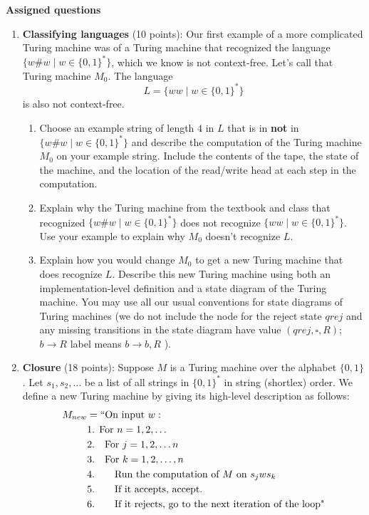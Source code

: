{\bf Assigned questions}
\begin{enumerate}[wide, labelwidth=!, labelindent=0pt]

\item\textbf{Classifying languages} (10 points):
Our first example of a more complicated Turing machine was of a Turing machine 
that recognized the language $\{w \# w \mid w \in\{0,1\}^*\}$, which we 
know is not context-free. Let's call that Turing machine $M_0$. The language
\[
    L = \{ww \mid w \in \{0,1\}^*\}
\]
is also not context-free. 

\begin{enumerate}
    \item\gradeCorrectFirst Choose an example string of length $4$ in $L$ that is in {\bf not} in $\{w \# w \mid w \in\{0,1\}^*\}$ and describe the computation of the Turing machine $M_0$ on your example string. 
    Include the contents of the  tape, the state of the machine, and the location of the read/write head at each step in the computation.
    \item\gradeCompleteFirst Explain why the Turing machine from the textbook 
    and class that recognized $\{w \# w \mid w \in\{0,1\}^*\}$ does 
    not recognize $\{ww \mid w \in \{0,1\}^*\}$. Use your example to explain why $M_0$ doesn't recognize $L$.
    \item\gradeComplete Explain how you would change $M_0$ to get a 
    new Turing machine that does recognize $L$. Describe this new Turing machine using both an implementation-level definition and a state diagram of the Turing machine. You may use all 
    our usual conventions for state diagrams of Turing machines 
    (we do not include the node for the reject state $qrej$ and any missing transitions 
    in the state diagram have value $(qrej,\square,R)$; 
    $b \to R$ label means $b \to b, R$ ).
\end{enumerate}

\item\textbf{Closure} (18 points):
Suppose $M$ is a Turing machine over the alphabet $\{0,1\}$. 
Let $s_1, s_2, \ldots$ be a list of all strings in 
$\{0,1\}^*$ in string (shortlex) order.
We define a new Turing machine 
by giving its high-level description as follows: 
\begin{align*}
   M_{new} &= ``\text{On input }w:\\
    &\text{1. For $n = 1, 2, \ldots$}\\
    &\text{2.~~~For $j = 1, 2, \ldots n$} \\
    &\text{3.~~~For $k = 1, 2, \ldots, n$} \\
    &\text{4.~~~~~~Run the computation of $M$ on $s_jws_k$}\\
    &\text{5.~~~~~~If it accepts, accept.}\\
    &\text{6.~~~~~~If it rejects, go to the next iteration of the loop"}\\
\end{align*}


\end{enumerate}
